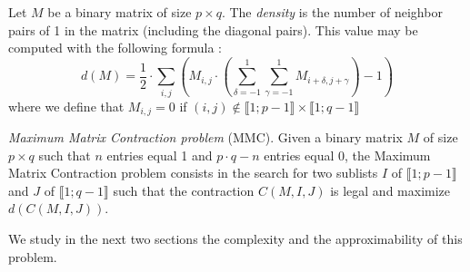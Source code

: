 \begin{definition}
	Let $M$ be a binary matrix of size $p \times q$. The \emph{density} is the number of neighbor pairs of 1 in the matrix (including the diagonal pairs). This value may be computed with the following formula :
	$$ 
	d(M) = \frac{1}{2} \cdot \sum\limits_{i,j} \left( M_{i,j} \cdot \left(\sum\limits_{\delta = -1}^1 \sum\limits_{\gamma = -1}^1  M_{i+\delta,j+\gamma}\right) - 1 \right)
	$$
	where we define that $M_{i,j}=0$ if $(i,j) \notin \llbracket 1;p-1 \rrbracket \times \llbracket 1;q-1 \rrbracket$
\end{definition}

\begin{problem}\label{problem1}
	\emph{Maximum Matrix Contraction problem} (MMC). Given a binary matrix $M$ of size $p \times q$ such that $n$ entries equal 1 and $p \cdot q - n$ entries equal 0, the Maximum Matrix Contraction problem consists in the search for two sublists $I$ of $\llbracket 1;p-1 \rrbracket$ and $J$ of $\llbracket 1;q-1 \rrbracket$ such that the contraction $C(M,I,J)$ is legal and maximize $d(C(M,I,J))$.
\end{problem}

We study in the next two sections the complexity and the approximability of this problem.

